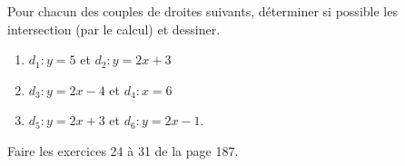 
\begin{exercice}\label{exosmath-0609}

    Pour chacun des couples de droites suivants, déterminer si possible les intersection (par le calcul) et dessiner.
    \begin{enumerate}
        \item
            \( d_1:y=5\) et \( d_2:y=2x+3\)
        \item
            \( d_3:y=2x-4\) et \( d_4:x=6\)
        \item
            \( d_5:y=2x+3\) et \( d_6:y=2x-1\).
    \end{enumerate}

    Faire les exercices 24 à 31 de la page 187.

\end{exercice}
